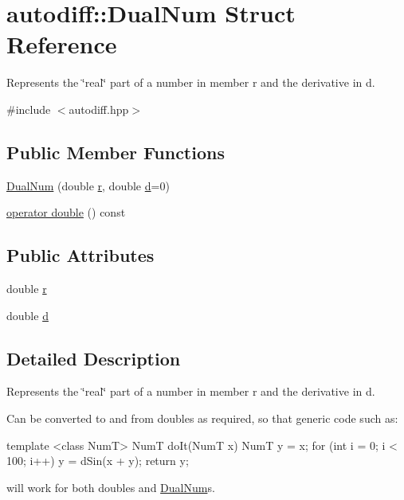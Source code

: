 \hypertarget{structautodiff_1_1_dual_num}{\section{autodiff\-:\-:Dual\-Num Struct Reference}
\label{structautodiff_1_1_dual_num}
}


Represents the \char`\"{}real\char`\"{} part of a number in member {\ttfamily r} and the derivative in {\ttfamily d}.  




{\ttfamily \#include $<$autodiff.\-hpp$>$}

\subsection*{Public Member Functions}
\begin{DoxyCompactItemize}
\item 
\hyperlink{structautodiff_1_1_dual_num_a59cc7ae0820734ea70b97a5e44a31994}{Dual\-Num} (double \hyperlink{structautodiff_1_1_dual_num_a09c8328f01c11052faad5928ab6cf587}{r}, double \hyperlink{structautodiff_1_1_dual_num_a6123e34e9dc68f7e40bf54cc67088b01}{d}=0)
\item 
\hyperlink{structautodiff_1_1_dual_num_aff54e197c1eeaf2421908cb55f0cd824}{operator double} () const 
\end{DoxyCompactItemize}
\subsection*{Public Attributes}
\begin{DoxyCompactItemize}
\item 
double \hyperlink{structautodiff_1_1_dual_num_a09c8328f01c11052faad5928ab6cf587}{r}
\item 
double \hyperlink{structautodiff_1_1_dual_num_a6123e34e9dc68f7e40bf54cc67088b01}{d}
\end{DoxyCompactItemize}


\subsection{Detailed Description}
Represents the \char`\"{}real\char`\"{} part of a number in member {\ttfamily r} and the derivative in {\ttfamily d}. 

Can be converted to and from {\ttfamily double}s as required, so that generic code such as\-: \begin{DoxyVerb} template <class NumT>
 NumT doIt(NumT x) {
     NumT y = x;
     for (int i = 0; i < 100; i++) {
         y = dSin(x + y);
     }
     return y;
 }\end{DoxyVerb}
 will work for both {\ttfamily double}s and {\ttfamily \hyperlink{structautodiff_1_1_dual_num}{Dual\-Num}}s. 


